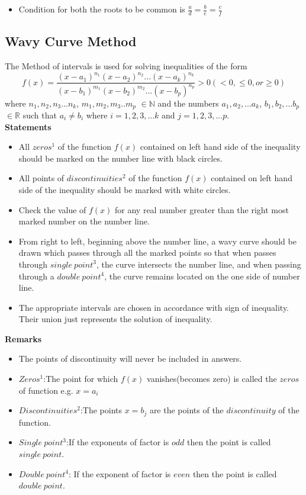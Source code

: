 \documentclass[12pt]{article}
\begin{document}
\begin{itemize}
\item Condition for both the roots to be common is $\frac{a}{d}=\frac{b}{e}=\frac{c}{f}$
\end{itemize}
\subsection{Wavy Curve Method}
The Method of intervals is used for solving inequalities of the form 
$$f(x)= \frac{(x-a_1)^{n_1}(x-a_2)^{n_2}...(x-a_k)^{n_k}}{(x-b_1)^{m_1}(x-b_2)^{m_2}...(x-b_p)^{n_p}} >0(<0, \le 0, or \ge 0 )$$
where $n_1,n_2,n_3...n_k$, $m_1,m_2,m_3..m_p$ $\in \mathbb{N}$ and the numbers $a_1,a_2,...a_k$, $b_1,b_2,...b_p$ $\in \mathbb{R}$ such that
$a_i \not= b_i$ where $i=1,2,3,...k$ and $j=1,2,3,...p$.\\
\textbf{Statements}
\begin{itemize}
\item All $zeros^1$ of the function $f(x)$ contained on left hand side of the inequality should be marked on the number line with black circles.
\item All points of $discontinuities^2$ of the function $f(x)$ contained on left hand side of the inequality should be marked with white circles.
\item Check the value of $f(x)$ for any real number greater than the right most marked number on the number line. 
\item From right to left, beginning above the number line, a wavy curve should be drawn which passes through all the marked points so that when passes through $single \medspace point^3$, the curve intersects the number line, and when passing through a $double \medspace point^4$, the curve remains located on the one side of number line.
\item The appropriate intervals are chosen in accordance with sign of inequality. Their union just represents the solution of inequality.
\end{itemize}
\textbf{Remarks}
\begin{itemize}
\item The points of discontinuity will never be included in answers.
\item $Zeros^1$:The point for which $f(x)$ vanishes(becomes zero) is called the $zeros$ of function e.g. $x=a_i$
\item $Discontinuities^2$:The points $x=b_j$ are the points of the $discontinuity$ of the function.
\item $Single \medspace point^3$:If the exponents of factor is $odd$ then the point is called $single \medspace point$.
\item $Double \medspace point^4$: If the exponent of factor is $even$ then the point is called $double \medspace point$.
\end{itemize}
\end{document}
